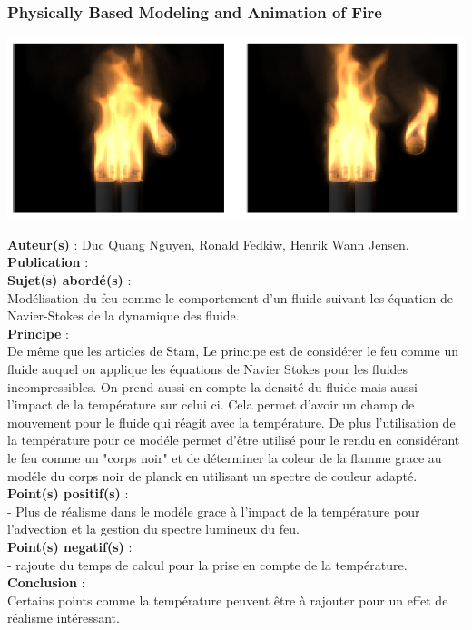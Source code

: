 \documentclass[a4paper,10pt]{article}
\begin{document}
\subsubsection{Physically Based Modeling and Animation of Fire}
    \begin{center}
	\includegraphics[scale=0.9]{Physically.ps}
    \end{center}
\textbf{Auteur(s)} : Duc Quang Nguyen, Ronald Fedkiw, Henrik Wann Jensen.\\
\textbf{Publication} :  \\
\textbf{Sujet(s) abordé(s)} : \\ 
	Modélisation du feu comme le comportement d'un fluide suivant les équation de Navier-Stokes de la dynamique des fluide.\\
\textbf{Principe} :\\	
	De même que les articles de Stam, Le principe est de considérer le feu comme un fluide auquel on applique les équations de Navier Stokes  pour les fluides incompressibles. On prend aussi en compte la densité du fluide mais aussi l'impact de la température sur celui ci. Cela permet d'avoir un champ de mouvement pour le fluide qui réagit avec la température. De plus l'utilisation de la température pour ce modéle permet d'être utilisé pour le rendu en considérant le feu comme un "corps noir" et de déterminer la coleur de la flamme grace au modéle du corps noir de planck en utilisant un spectre de couleur adapté.\\
\textbf{Point(s) positif(s)} :\\
	- Plus de réalisme dans le modéle grace à l'impact de la température pour l'advection et la gestion du spectre lumineux du feu.\\	
\textbf{Point(s) negatif(s)} :\\
	- rajoute du temps de calcul pour la prise en compte de la température.\\
\textbf{Conclusion} :\\
	Certains points comme la température peuvent être à rajouter pour un effet de réalisme intéressant.\\
\end{document}
